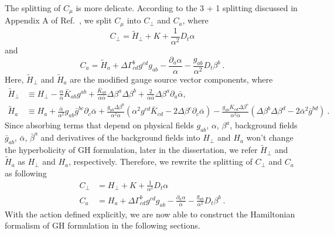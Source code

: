 The splitting of $C_{\mu}$ is more delicate. According to the 3 + 1 splitting discussed in Appendix A of Ref.~\cite{Brown:2011qg}, we split $C_{\mu}$ into $C_{\perp}$ and $C_{a}$, where
\begin{equation}
C_{\perp} = {\tilde H}_{\perp} + K + \frac{1}{\alpha^{2}}D_{t}\alpha
\end{equation}
and
\begin{equation}
C_{a} = {\tilde H}_{a} + \Delta \Gamma^{b}_{cd}g^{cd}g_{ab} - \frac{\partial_{a}\alpha}{\alpha} - \frac{g_{ab}}{\alpha^2}D_{t}\beta^{b} \ .
\end{equation}
Here, ${\tilde H}_{\perp}$ and ${\tilde H}_{a}$ are the modified gauge source vector components, where
\begin{subequations}
\begin{align}
{\tilde H}_{\perp} & \equiv H_{\perp} - \frac{\alpha}{{\bar \alpha}}{\bar K}_{ab}g^{ab} + \frac{{\bar K}_{ab}}{\alpha{\bar \alpha}}\Delta \beta^{a} \Delta \beta^{b} + \frac{2}{\alpha {\bar \alpha}}\Delta \beta^{a} \partial_{a}{\bar \alpha}, \\
{\tilde H}_{a} & \equiv H_{a} + \frac{{\bar \alpha}}{\alpha^2}g_{ab}{\bar g}^{bc}\partial_{c}{\bar \alpha} + \frac{g_{ab}\Delta \beta^{b}}{\alpha^2 {\bar \alpha}}(\alpha^2g^{cd}{\bar K}_{cd} - 2\Delta\beta^{c}\partial_{c}{\bar \alpha}) - \frac{g_{ab}{\bar K}_{cd}\Delta \beta^{c}}{\alpha^2{\bar \alpha}}(\Delta \beta^{b}\Delta \beta^{d} - 2{\bar \alpha}^2{\bar g}^{bd}) \ .
\end{align}
\end{subequations}
Since absorbing terms that depend on physical fields $g_{ab}$, $\alpha$, $\beta^{a}$, background fields ${\bar g}_{ab}$, ${\bar \alpha}$, ${\bar \beta}^{a}$ and derivatives of the background fields into $H_{\perp}$ and $H_{a}$ won't change the hyperbolicity of GH formulation\cite{Brown:2011qg}, later in the dissertation, we refer ${\tilde H}_{\perp}$ and ${\tilde H}_{a}$ as $H_{\perp}$ and $H_{a}$, respectively. Therefore, we rewrite the splitting of $C_{\perp}$ and $C_{a}$ as following
\begin{subequations}
\begin{align}
C_{\perp} & = H_{\perp} + K + \frac{1}{\alpha^{2}}D_{t}\alpha\\
C_{a} & = H_{a} + \Delta \Gamma^{b}_{cd}g^{cd}g_{ab} - \frac{\partial_{a}\alpha}{\alpha} - \frac{g_{ab}}{\alpha^2}D_{t}\beta^{b} \ .
\end{align}
\end{subequations}
With the action defined explicitly, we are now able to construct the Hamiltonian formalism of GH formulation in the following sections. 
